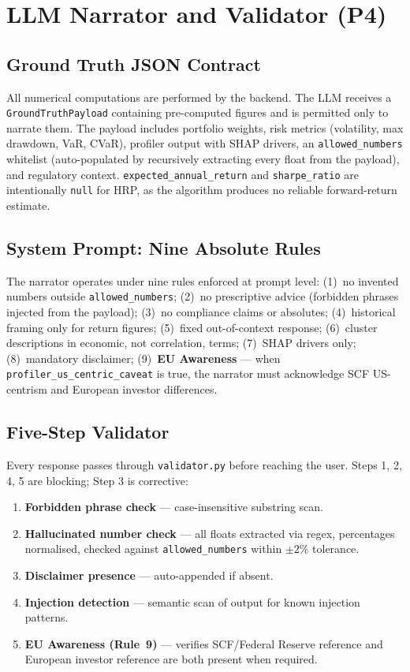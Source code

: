 \documentclass[11pt, a4paper]{article}
\begin{document}
\section{LLM Narrator and Validator (P4)}

\subsection{Ground Truth JSON Contract}
All numerical computations are performed by the backend. The LLM receives a \texttt{GroundTruthPayload} containing pre-computed figures and is permitted only to narrate them. The payload includes portfolio weights, risk metrics (volatility, max drawdown, VaR, CVaR), profiler output with SHAP drivers, an \texttt{allowed\_numbers} whitelist (auto-populated by recursively extracting every float from the payload), and regulatory context. \texttt{expected\_annual\_return} and \texttt{sharpe\_ratio} are intentionally \texttt{null} for HRP, as the algorithm produces no reliable forward-return estimate.

\subsection{System Prompt: Nine Absolute Rules}
The narrator operates under nine rules enforced at prompt level: (1)~no invented numbers outside \texttt{allowed\_numbers}; (2)~no prescriptive advice (forbidden phrases injected from the payload); (3)~no compliance claims or absolutes; (4)~historical framing only for return figures; (5)~fixed out-of-context response; (6)~cluster descriptions in economic, not correlation, terms; (7)~SHAP drivers only; (8)~mandatory disclaimer; (9)~\textbf{EU Awareness} — when \texttt{profiler\_us\_centric\_caveat} is true, the narrator must acknowledge SCF US-centrism and European investor differences.

\subsection{Five-Step Validator}
Every response passes through \texttt{validator.py} before reaching the user. Steps 1, 2, 4, 5 are blocking; Step 3 is corrective:
\begin{enumerate}
  \item \textbf{Forbidden phrase check} — case-insensitive substring scan.
  \item \textbf{Hallucinated number check} — all floats extracted via regex, percentages normalised, checked against \texttt{allowed\_numbers} within $\pm2\%$ tolerance.
  \item \textbf{Disclaimer presence} — auto-appended if absent.
  \item \textbf{Injection detection} — semantic scan of output for known injection patterns.
  \item \textbf{EU Awareness (Rule~9)} — verifies SCF/Federal Reserve reference and European investor reference are both present when required.
\end{enumerate}
\end{document}
